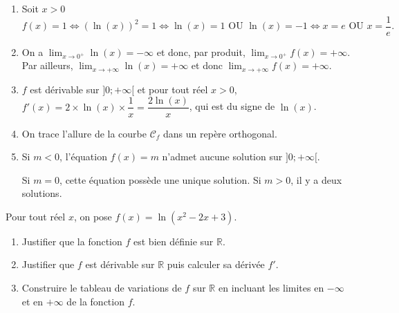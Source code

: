 \documentclass[11pt,fleqn, openany]{book} %
\begin{document}
\begin{solution}\hspace{0pt}
\begin{enumerate}
\item Soit $x>0$
\[ f(x)=1 \Leftrightarrow (\ln(x))^2 = 1 \Leftrightarrow \ln(x)=1 \text{ OU } \ln(x)=-1 \Leftrightarrow x=e \text{ OU } x = \dfrac{1}{e}.\]
\item On a $\displaystyle\lim_{x\to 0^+}\ln(x)=-\infty$ et donc, par produit, $\displaystyle\lim_{x\to 0^+}f(x)=+\infty$. Par ailleurs, $\displaystyle\lim_{x\to +\infty}\ln(x)=+\infty$ et donc $\displaystyle\lim_{x\to +\infty}f(x)=+\infty$.
\item $f$ est dérivable sur $]0;+\infty[$ et pour tout réel $x>0$, $f'(x)= 2 \times \ln(x) \times \dfrac{1}{x} = \dfrac{2\ln(x)}{x}$, qui est du signe de $\ln(x)$.
\begin{center}
\end{center}
\item On trace l'allure de la courbe $\mathcal{C}_f$ dans un repère orthogonal.

\begin{center}
\end{center}

\item Si $m < 0$, l'équation $f(x)=m$ n'admet aucune solution sur $]0;+\infty[$.

Si $m=0$, cette équation possède une unique solution. Si $m>0$, il y a deux solutions.

\end{enumerate}
\end{solution}




\begin{exercise}
Pour tout réel $x$, on pose $f(x)=\ln(x^2-2x+3)$.
\begin{enumerate}
\item Justifier que la fonction $f$ est bien définie sur $\mathbb{R}$.
\item Justifier que $f$ est dérivable sur $\mathbb{R}$ puis calculer sa dérivée $f'$.
\item Construire le tableau de variations de $f$ sur $\mathbb{R}$ en incluant les limites en $-\infty$ et en $+\infty$ de la fonction $f$.
\end{enumerate}
\end{exercise}
\end{document}
